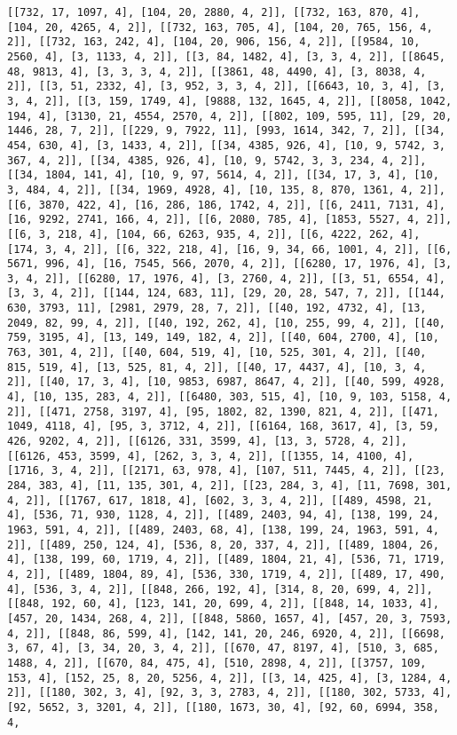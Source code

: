 \documentclass[12pt,fleqn]{article}\usepackage{../../common}
\begin{document}
\begin{verbatim}
[[732, 17, 1097, 4], [104, 20, 2880, 4, 2]], [[732, 163, 870, 4], [104, 20, 4265, 4, 2]], [[732, 163, 705, 4], [104, 20, 765, 156, 4, 2]], [[732, 163, 242, 4], [104, 20, 906, 156, 4, 2]], [[9584, 10, 2560, 4], [3, 1133, 4, 2]], [[3, 84, 1482, 4], [3, 3, 4, 2]], [[8645, 48, 9813, 4], [3, 3, 3, 4, 2]], [[3861, 48, 4490, 4], [3, 8038, 4, 2]], [[3, 51, 2332, 4], [3, 952, 3, 3, 4, 2]], [[6643, 10, 3, 4], [3, 3, 4, 2]], [[3, 159, 1749, 4], [9888, 132, 1645, 4, 2]], [[8058, 1042, 194, 4], [3130, 21, 4554, 2570, 4, 2]], [[802, 109, 595, 11], [29, 20, 1446, 28, 7, 2]], [[229, 9, 7922, 11], [993, 1614, 342, 7, 2]], [[34, 454, 630, 4], [3, 1433, 4, 2]], [[34, 4385, 926, 4], [10, 9, 5742, 3, 367, 4, 2]], [[34, 4385, 926, 4], [10, 9, 5742, 3, 3, 234, 4, 2]], [[34, 1804, 141, 4], [10, 9, 97, 5614, 4, 2]], [[34, 17, 3, 4], [10, 3, 484, 4, 2]], [[34, 1969, 4928, 4], [10, 135, 8, 870, 1361, 4, 2]], [[6, 3870, 422, 4], [16, 286, 186, 1742, 4, 2]], [[6, 2411, 7131, 4], [16, 9292, 2741, 166, 4, 2]], [[6, 2080, 785, 4], [1853, 5527, 4, 2]], [[6, 3, 218, 4], [104, 66, 6263, 935, 4, 2]], [[6, 4222, 262, 4], [174, 3, 4, 2]], [[6, 322, 218, 4], [16, 9, 34, 66, 1001, 4, 2]], [[6, 5671, 996, 4], [16, 7545, 566, 2070, 4, 2]], [[6280, 17, 1976, 4], [3, 3, 4, 2]], [[6280, 17, 1976, 4], [3, 2760, 4, 2]], [[3, 51, 6554, 4], [3, 3, 4, 2]], [[144, 124, 683, 11], [29, 20, 28, 547, 7, 2]], [[144, 630, 3793, 11], [2981, 2979, 28, 7, 2]], [[40, 192, 4732, 4], [13, 2049, 82, 99, 4, 2]], [[40, 192, 262, 4], [10, 255, 99, 4, 2]], [[40, 759, 3195, 4], [13, 149, 149, 182, 4, 2]], [[40, 604, 2700, 4], [10, 763, 301, 4, 2]], [[40, 604, 519, 4], [10, 525, 301, 4, 2]], [[40, 815, 519, 4], [13, 525, 81, 4, 2]], [[40, 17, 4437, 4], [10, 3, 4, 2]], [[40, 17, 3, 4], [10, 9853, 6987, 8647, 4, 2]], [[40, 599, 4928, 4], [10, 135, 283, 4, 2]], [[6480, 303, 515, 4], [10, 9, 103, 5158, 4, 2]], [[471, 2758, 3197, 4], [95, 1802, 82, 1390, 821, 4, 2]], [[471, 1049, 4118, 4], [95, 3, 3712, 4, 2]], [[6164, 168, 3617, 4], [3, 59, 426, 9202, 4, 2]], [[6126, 331, 3599, 4], [13, 3, 5728, 4, 2]], [[6126, 453, 3599, 4], [262, 3, 3, 4, 2]], [[1355, 14, 4100, 4], [1716, 3, 4, 2]], [[2171, 63, 978, 4], [107, 511, 7445, 4, 2]], [[23, 284, 383, 4], [11, 135, 301, 4, 2]], [[23, 284, 3, 4], [11, 7698, 301, 4, 2]], [[1767, 617, 1818, 4], [602, 3, 3, 4, 2]], [[489, 4598, 21, 4], [536, 71, 930, 1128, 4, 2]], [[489, 2403, 94, 4], [138, 199, 24, 1963, 591, 4, 2]], [[489, 2403, 68, 4], [138, 199, 24, 1963, 591, 4, 2]], [[489, 250, 124, 4], [536, 8, 20, 337, 4, 2]], [[489, 1804, 26, 4], [138, 199, 60, 1719, 4, 2]], [[489, 1804, 21, 4], [536, 71, 1719, 4, 2]], [[489, 1804, 89, 4], [536, 330, 1719, 4, 2]], [[489, 17, 490, 4], [536, 3, 4, 2]], [[848, 266, 192, 4], [314, 8, 20, 699, 4, 2]], [[848, 192, 60, 4], [123, 141, 20, 699, 4, 2]], [[848, 14, 1033, 4], [457, 20, 1434, 268, 4, 2]], [[848, 5860, 1657, 4], [457, 20, 3, 7593, 4, 2]], [[848, 86, 599, 4], [142, 141, 20, 246, 6920, 4, 2]], [[6698, 3, 67, 4], [3, 34, 20, 3, 4, 2]], [[670, 47, 8197, 4], [510, 3, 685, 1488, 4, 2]], [[670, 84, 475, 4], [510, 2898, 4, 2]], [[3757, 109, 153, 4], [152, 25, 8, 20, 5256, 4, 2]], [[3, 14, 425, 4], [3, 1284, 4, 2]], [[180, 302, 3, 4], [92, 3, 3, 2783, 4, 2]], [[180, 302, 5733, 4], [92, 5652, 3, 3201, 4, 2]], [[180, 1673, 30, 4], [92, 60, 6994, 358, 4, 
\end{verbatim}
\end{document}
